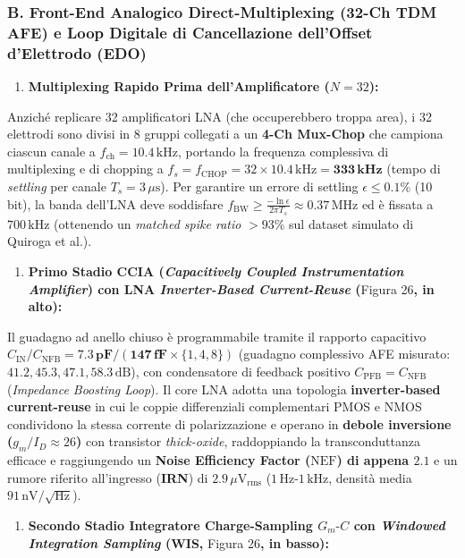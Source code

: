 \documentclass[11pt,a4paper]{article}
\begin{document}
\subsubsection{B. Front-End Analogico Direct-Multiplexing (32-Ch TDM AFE) e Loop Digitale di Cancellazione dell'Offset d'Elettrodo (EDO)}
\begin{enumerate}
  \item \textbf{Multiplexing Rapido Prima dell'Amplificatore ($N = 32$):}
\end{enumerate}
Anziché replicare 32 amplificatori LNA (che occuperebbero troppa area), i 32 elettrodi sono divisi in 8 gruppi collegati a un \textbf{4-Ch Mux-Chop} che campiona ciascun canale a $f_{\text{ch}} = 10.4\,\text{kHz}$, portando la frequenza complessiva di multiplexing e di chopping a \textbf{$f_s = f_{\text{CHOP}} = 32 \times 10.4\,\text{kHz} = \mathbf{333\,\text{kHz}}$} (tempo di \textit{settling} per canale $T_s = 3\,\mu\text{s}$). Per garantire un errore di settling $\epsilon \le 0.1\%$ (10 bit), la banda dell'LNA deve soddisfare $f_{\text{BW}} \ge \frac{-\ln \epsilon}{2\pi T_s} \approx 0.37\,\text{MHz}$ ed è fissata a \textbf{$700\,\text{kHz}$} (ottenendo un \textit{matched spike ratio} $>93\%$ sul dataset simulato di Quiroga et al.).
\begin{enumerate}
  \item \textbf{Primo Stadio CCIA (\textit{Capacitively Coupled Instrumentation Amplifier}) con LNA \textit{Inverter-Based Current-Reuse} (}Figura 26\textbf{, in alto):}
\end{enumerate}
Il guadagno ad anello chiuso è programmabile tramite il rapporto capacitivo $C_{\text{IN}} / C_{\text{NFB}} = \mathbf{7.3\,\text{pF}} / (\mathbf{147\,\text{fF}} \times \{1, 4, 8\})$ (guadagno complessivo AFE misurato: \textbf{$41.2, 45.3, 47.1, 58.3\,\text{dB}$}), con condensatore di feedback positivo $C_{\text{PFB}} = C_{\text{NFB}}$ (\textit{Impedance Boosting Loop}). Il core LNA adotta una topologia \textbf{inverter-based current-reuse} in cui le coppie differenziali complementari PMOS e NMOS condividono la stessa corrente di polarizzazione e operano in \textbf{debole inversione ($g_m / I_D \approx 26$)} con transistor \textit{thick-oxide}, raddoppiando la transconduttanza efficace e raggiungendo un \textbf{Noise Efficiency Factor ($\text{NEF}$) di appena $2.1$} e un rumore riferito all'ingresso (\textbf{IRN}) di \textbf{$2.9\,\mu\text{V}_{\text{rms}}$} ($1\,\text{Hz}\text{-}1\,\text{kHz}$, densità media $91\,\text{nV}/\sqrt{\text{Hz}}$).
\begin{enumerate}
  \item \textbf{Secondo Stadio Integratore Charge-Sampling $G_m\text{-}C$ con \textit{Windowed Integration Sampling} (WIS, }Figura 26\textbf{, in basso):}
\end{enumerate}
\end{document}

